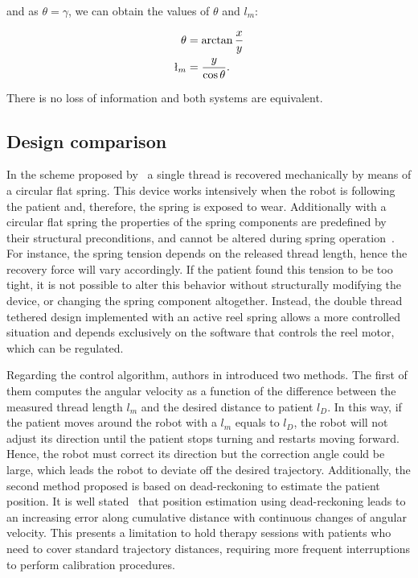 \documentclass[journal]{IEEEtran}
\begin{document}
\noindent and as $\theta = \gamma$, we can obtain the values of $\theta$ and $l_m$:

\begin{align*}
\theta &= \arctan{ \frac{x}{y}} \\
\l_m    &= \frac{y}{\cos{\theta}}. \\
\end{align*}

There is no loss of information and both systems are equivalent.

\subsection{Design comparison}

In the scheme proposed by~\cite{Endo2015} a single thread is recovered mechanically by means of a circular flat spring. This device works intensively when the robot is following the patient and, therefore, the spring is exposed to wear. Additionally with a circular flat spring the properties of the spring components are predefined by their structural preconditions, and cannot be altered during spring operation~\cite{wurmthaler2013apparatus}. For instance, the spring tension depends on the released thread length, hence the recovery force will vary accordingly.  If the patient found this tension to be too tight, it is not possible to alter this behavior without structurally modifying the device, or changing the spring component altogether.  Instead, the double thread tethered design implemented with an active reel spring allows a more controlled situation and depends exclusively on the software that controls the reel motor, which can be regulated. 

Regarding the control algorithm, authors in \cite{Endo2015} introduced two methods. The first of them computes the angular velocity as a function of the difference between the measured thread length $l_m$ and the desired distance to patient  $l_D$. In this way, if the patient moves around the robot with a $l_m$ equals to $l_D$, the robot will not adjust its direction until the patient stops turning and restarts moving forward. Hence, the robot must correct its direction but the correction angle could be large, which leads the robot to deviate off the desired trajectory. Additionally, the second method proposed is based on dead-reckoning to estimate the patient position. It is well stated~\cite{DurrantWhyte1994} that position estimation using dead-reckoning leads to an increasing error along cumulative distance with continuous changes of angular velocity. This presents a limitation to hold therapy sessions with patients who need to cover standard trajectory distances, requiring more frequent interruptions to perform calibration procedures.
\end{document}
